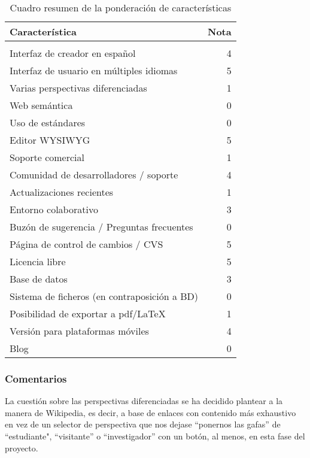 \begin{table}[h]
\begin{center}
\begin{tabular}{l @{\hspace{10px}} r}
Característica & Nota \\
\hline \\
Interfaz de creador en español & 4 \\
Interfaz de usuario en múltiples idiomas & 5 \\
Varias perspectivas diferenciadas & 1 \\
Web semántica & 0 \\
Uso de estándares & 0 \\
Editor WYSIWYG & 5 \\
Soporte comercial & 1 \\
Comunidad de desarrolladores / soporte & 4 \\
Actualizaciones recientes & 1 \\
Entorno colaborativo & 3 \\
Buzón de sugerencia / Preguntas frecuentes & 0 \\
Página de control de cambios / CVS & 5 \\
Licencia libre & 5 \\
Base de datos & 3 \\
Sistema de ficheros (en contraposición a BD) & 0 \\
Posibilidad de exportar a pdf/LaTeX & 1 \\
Versión para plataformas móviles & 4 \\
Blog & 0 \\
\end{tabular}
\end{center}
\caption{Cuadro resumen de la ponderación de características}
\label{tab:caracteristicas}
\end{table}


\subsubsection{Comentarios}

\par La cuestión sobre las perspectivas diferenciadas se ha decidido plantear a la manera de Wikipedia, es decir, a base de enlaces con contenido más exhaustivo en vez de un selector de perspectiva que nos dejase ``ponernos las gafas'' de ``estudiante", ``visitante'' o ``investigador'' con un botón, al menos, en esta fase del proyecto.

